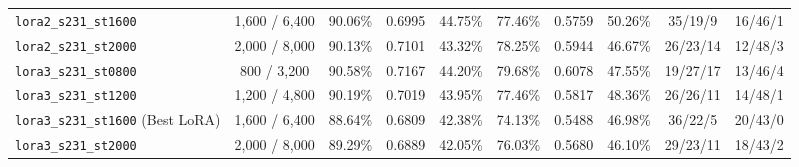 \documentclass[11pt]{article}
\begin{document}
\begin{table}[ht]
\begin{tabular}{lccccccccc}
\texttt{lora2\_s231\_st1600} & 1,600 / 6,400 & 90.06\% & 0.6995 & 44.75\% & 77.46\% & 0.5759 & 50.26\% & 35/19/9 & 16/46/1 \\
\texttt{lora2\_s231\_st2000} & 2,000 / 8,000 & 90.13\% & 0.7101 & 43.32\% & 78.25\% & 0.5944 & 46.67\% & 26/23/14 & 12/48/3 \\
\midrule
\texttt{lora3\_s231\_st0800} & 800 / 3,200 & 90.58\% & 0.7167 & 44.20\% & 79.68\% & 0.6078 & 47.55\% & 19/27/17 & 13/46/4 \\
\texttt{lora3\_s231\_st1200} & 1,200 / 4,800 & 90.19\% & 0.7019 & 43.95\% & 77.46\% & 0.5817 & 48.36\% & 26/26/11 & 14/48/1 \\
\texttt{lora3\_s231\_st1600} (Best LoRA) & 1,600 / 6,400 & 88.64\% & 0.6809 & 42.38\% & 74.13\% & 0.5488 & 46.98\% & 36/22/5 & 20/43/0 \\
\texttt{lora3\_s231\_st2000} & 2,000 / 8,000 & 89.29\% & 0.6889 & 42.05\% & 76.03\% & 0.5680 & 46.10\% & 29/23/11 & 18/43/2 \\
\bottomrule
\end{tabular}
\end{table}
\end{document}
